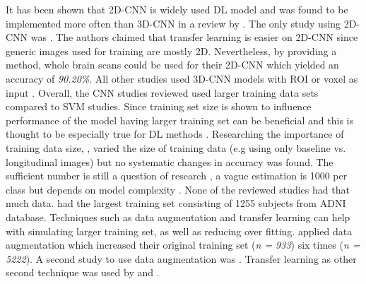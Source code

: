 It has been shown that 2D-CNN is widely used DL model and was found to be implemented more often than 3D-CNN in a review by \textcite{ebrahimighahnaviehDeepLearningDetect2020}. The only study using 2D-CNN was \textcite{nanniComparisonTransferLearning2020}. The authors claimed that transfer learning is easier on 2D-CNN since generic images used for training are mostly 2D. Nevertheless, by providing a method, whole brain scans could be used for their 2D-CNN which yielded an accuracy of \textit{90.20\%}. All other studies used 3D-CNN models with ROI \autocite[e.g.][]{liuMultimodelDeepConvolutional2020a, wangDenseCNNDenselyConnected2021, wenConvolutionalNeuralNetworks2020} or voxel as input \autocite[e.g.][]{wenConvolutionalNeuralNetworks2020, yeeConstructionMRIBasedAlzheimer2021,nanniComparisonTransferLearning2020}. Overall, the CNN studies reviewed used larger training data sets compared to SVM studies. Since training set size is shown to influence performance of the model \autocite[Wang, 2019, as cited in][]{ebrahimighahnaviehDeepLearningDetect2020} having larger training set can be beneficial and this is thought to be especially true for DL methods \autocite{vieiraUsingDeepLearning2017}. Researching the importance of training data size, \textcite{wenConvolutionalNeuralNetworks2020}, varied the size of training data (e.g using only baseline vs. longitudinal images) but no systematic changes in accuracy was found. The sufficient number is still a question of research \autocite{nanniComparisonTransferLearning2020}, a vague estimation is 1000 per class but depends on model complexity \autocite[Moradi, 2015, as cited in][]{nanniComparisonTransferLearning2020}. None of the reviewed studies had that much data. \textcite{wenConvolutionalNeuralNetworks2020} had the largest training set consisting of 1255 subjects from ADNI database. Techniques such as data augmentation and transfer learning can help with simulating larger training set, as well as reducing over fitting. \textcite{wangDenseCNNDenselyConnected2021} applied data augmentation which increased their original training set (\textit{n = 933}) six times (\textit{n = 5222}). A second study to use data augmentation was \textcite{yeeConstructionMRIBasedAlzheimer2021}. Transfer learning as other second technique was used by \textcite{wenConvolutionalNeuralNetworks2020} and \textcite{nanniComparisonTransferLearning2020}.
